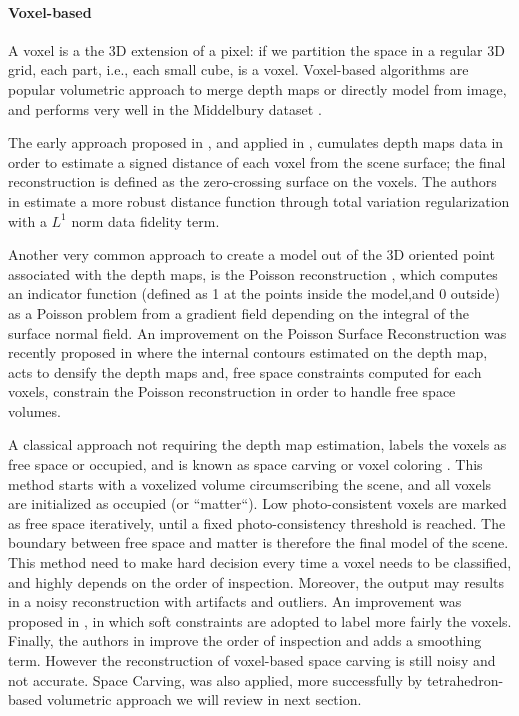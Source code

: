 \paragraph{Voxel-based}
A voxel is a the 3D extension of a pixel: if we partition the space in a regular 3D grid, each part, i.e., each small cube, is a voxel.
Voxel-based  algorithms are popular volumetric approach to merge depth maps or directly model from image, and performs very well in the Middelbury dataset \cite{Seitz_et_al06}.

The early approach proposed in \cite{curless1996volumetric}, and applied in \cite{goesele2006multi}, cumulates depth maps data in order to estimate a signed distance of each voxel from the scene surface; the final reconstruction is defined as the zero-crossing surface on the voxels.
The authors in \cite{zach2007globally} estimate a more robust distance function through total variation regularization with a $L^1$ norm data fidelity term.

Another very common approach to create a model out of the 3D oriented point associated with the depth maps, is the Poisson reconstruction \cite{kazhdan2006poisson}, which computes an indicator function (defined as 1 at the points inside the model,and 0  outside) as a Poisson problem from a gradient field depending on the integral of the surface normal field.
An improvement on the Poisson Surface Reconstruction was recently proposed in \cite{shan2014occluding} where the internal contours estimated on the depth map, acts to densify the depth maps and, free space constraints computed for each voxels, constrain the Poisson reconstruction in order to handle free space volumes.

A classical approach not requiring the depth map estimation, labels the voxels as free space or occupied, and is known as space carving or voxel coloring \cite{seitz1999photorealistic,kutulakos_seitz05}. 
This method starts with a voxelized volume circumscribing the scene, and all voxels are initialized as occupied (or ``matter``). Low photo-consistent voxels are marked as free space iteratively, until a fixed photo-consistency threshold is reached. The boundary between free space and matter is therefore the final model of the scene. 
This method need to make hard decision every time a voxel needs to be classified, and highly depends on the order of inspection. Moreover, the output may results in a noisy reconstruction with artifacts and outliers.
An improvement was proposed in \cite{broadhurst2001probabilistic}, in which soft constraints are adopted to label more fairly the voxels.
Finally, the authors in \cite{yang2003multi} improve the order of inspection and adds a smoothing term. 
However the reconstruction of voxel-based space carving is still noisy and not  accurate.
Space Carving, was also applied, more successfully by tetrahedron-based volumetric approach we will  review in next section.

